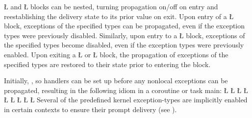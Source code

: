 \documentclass[openright,twoside]{report}
\begin{document}
\LGinlinetrue\LGbegin\lgrinde\L{}\endlgrinde\LGend{} and \LGinlinetrue\LGbegin\lgrinde\L{}\endlgrinde\LGend{} blocks can be nested, turning propagation on/off on entry and reestablishing the delivery state to its prior value on exit.
Upon entry of a \LGinlinetrue\LGbegin\lgrinde\L{}\endlgrinde\LGend{} block, exceptions of the specified types can be propagated, even if the exception types were previously disabled.
Similarly, upon entry to a \LGinlinetrue\LGbegin\lgrinde\L{}\endlgrinde\LGend{} block, exceptions of the specified types become disabled, even if the exception types were previously enabled.
Upon exiting a \LGinlinetrue\LGbegin\lgrinde\L{}\endlgrinde\LGend{} or \LGinlinetrue\LGbegin\lgrinde\L{}\endlgrinde\LGend{} block, the propagation of exceptions of the specified types are restored to their state prior to entering the block.

Initially, , so handlers can be set up before any nonlocal exceptions can be propagated, resulting in the following \uC idiom in a coroutine or task main:
\LGinlinefalse\LGbegin\lgrinde
\L{}
\L{\LB{}}
\CE{}\L{\LB{}}
\CE{}\L{\LB{}}
\CE{}\L{\LB{}}
\CE{}\L{\LB{}}
\CE{}\L{\LB{}}
\CE{}\L{\LB{}}
\CE{}\L{\LB{\}}}
\endlgrinde\LGend
Several of the predefined kernel exception-types are implicitly enabled in certain contexts to ensure their prompt delivery (see ).
\end{document}
